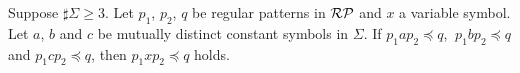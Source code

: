 %
\begin{lem}\label{Sato1:Lemma10}
    Suppose $\sharp \Sigma \geq 3$.
    Let $p_{1}$, $p_{2}$, $q$ be regular patterns in $\mathcal{RP}$ and $x$ a variable symbol. 
    Let $a$, $b$ and $c$ be mutually distinct constant symbols in $\Sigma$.
    If $p_{1}ap_{2} \preceq q$, $\ p_{1}bp_{2} \preceq q$ and $p_{1}cp_{2} \preceq q$, then $ p_{1}xp_{2}\preceq q$ holds.
\end{lem}



